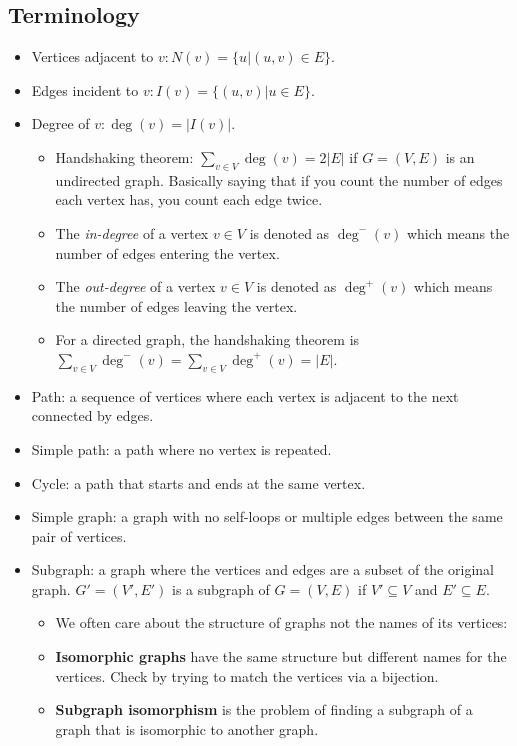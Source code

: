\documentclass[letterpaper,12pt]{article}
\begin{document}
\subsection{Terminology}
\begin{itemize}
    \item Vertices adjacent to $v:N(v)=\{u|(u,v)\in E\}$.
    \item Edges incident to $v:I(v)=\{(u,v)|u\in E\}$.
    \item Degree of $v:\deg(v)=|I(v)|$.\begin{itemize}
        \item Handshaking theorem: $\sum_{v\in V}\deg(v)=2|E|$ if $G=(V,E)$ is an undirected graph. Basically saying that if you count the number of edges each vertex has, you count each edge twice.
        \item The \textit{in-degree} of a vertex $v\in V$ is denoted as $\deg^-(v)$ which means the number of edges entering the vertex.
        \item The \textit{out-degree} of a vertex $v\in V$ is denoted as $\deg^+(v)$ which means the number of edges leaving the vertex.
        \item For a directed graph, the handshaking theorem is $\sum_{v\in V}\deg^-(v)=\sum_{v\in V}\deg^+(v)=|E|$.
    \end{itemize}
    \item Path: a sequence of vertices where each vertex is adjacent to the next connected by edges.
    \item Simple path: a path where no vertex is repeated.
    \item Cycle: a path that starts and ends at the same vertex.
    \item Simple graph: a graph with no self-loops or multiple edges between the same pair of vertices.
    \item Subgraph: a graph where the vertices and edges are a subset of the original graph. $G'=(V',E')$ is a subgraph of $G=(V,E)$ if $V'\subseteq V$ and $E'\subseteq E$.\begin{itemize}
        \item We often care about the structure of graphs not the names of its vertices: 
        \item \textbf{Isomorphic graphs} have the same structure but different names for the vertices. Check by trying to match the vertices via a bijection.
        \item \textbf{Subgraph isomorphism} is the problem of finding a subgraph of a graph that is isomorphic to another graph.

\end{itemize}
\end{itemize}
\end{document}
